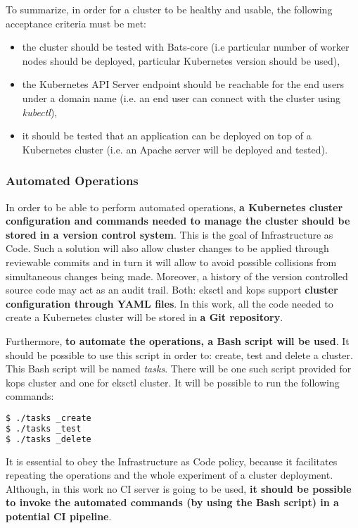 To summarize, in order for a cluster to be healthy and usable, the following acceptance criteria must be met:
\begin{itemize}
\item the cluster should be tested with Bats-core (i.e particular number of worker nodes should be deployed, particular Kubernetes version should be used),
\item the Kubernetes API Server endpoint should be reachable for the end users under a domain name (i.e. an end user can connect with the cluster using \textit{kubectl}),
\item it should be tested that an application can be deployed on top of a Kubernetes cluster (i.e. an Apache server will be deployed and tested).
\end{itemize}

\subsubsection{Automated Operations}

In order to be able to perform automated operations, \textbf{a Kubernetes cluster configuration and commands needed to manage the cluster should be stored in a version control system}. This is the goal of Infrastructure as Code. Such a solution will also allow cluster changes to be applied through reviewable commits and in turn it will allow to avoid possible collisions from simultaneous changes being made. Moreover, a history of the version controlled source code may act as an audit trail\cite{online-kops-ci}\cite{online-kops-manifest}. Both: eksctl and kops support \textbf{cluster configuration through YAML files}. In this work, all the code needed to create a Kubernetes cluster will be stored in \textbf{a Git repository}.

Furthermore, \textbf{to automate the operations, a Bash script will be used}. It should be possible to use this script in order to: create, test and delete a cluster. This Bash script will be named \textit{tasks}. There will be one such script provided for kops cluster and one for eksctl cluster. It will be possible to run the following commands:
\begin{lstlisting}[basicstyle=\small,caption={Commands provided by tasks file - a Bash script which automates a Kubernetes cluster operations},captionpos=b,language=Bash,xleftmargin=1cm]
$ ./tasks _create
$ ./tasks _test
$ ./tasks _delete
\end{lstlisting}

It is essential to obey the Infrastructure as Code policy, because it facilitates repeating the operations and the whole experiment of a cluster deployment. Although, in this work no CI server is going to be used, \textbf{it should be possible to invoke the automated commands (by using the Bash script) in a potential CI pipeline}.

